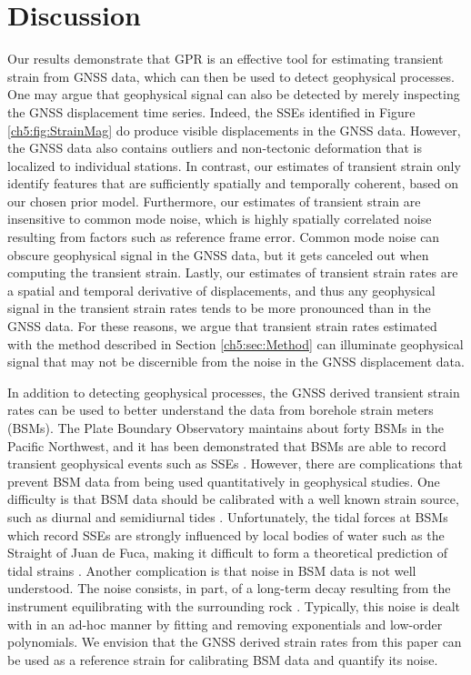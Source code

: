 \section{Discussion}\label{ch5:sec:Discussion}
Our results demonstrate that GPR is an effective tool for estimating
transient strain from GNSS data, which can then be used to detect
geophysical processes. One may argue that geophysical signal can also
be detected by merely inspecting the GNSS displacement time series.
Indeed, the SSEs identified in Figure \ref{ch5:fig:StrainMag} do
produce visible displacements in the GNSS data. However, the GNSS data
also contains outliers and non-tectonic deformation that is localized
to individual stations. In contrast, our estimates of transient strain
only identify features that are sufficiently spatially and temporally
coherent, based on our chosen prior model. Furthermore, our estimates
of transient strain are insensitive to common mode noise, which is
highly spatially correlated noise resulting from factors such as
reference frame error. Common mode noise can obscure geophysical
signal in the GNSS data, but it gets canceled out when computing the
transient strain. Lastly, our estimates of transient strain rates are
a spatial and temporal derivative of displacements, and thus any
geophysical signal in the transient strain rates tends to be more
pronounced than in the GNSS data. For these reasons, we argue that
transient strain rates estimated with the method described in Section
\ref{ch5:sec:Method} can illuminate geophysical signal that may not be
discernible from the noise in the GNSS displacement data.

In addition to detecting geophysical processes, the GNSS derived
transient strain rates can be used to better understand the data from
borehole strain meters (BSMs). The Plate Boundary Observatory
maintains about forty BSMs in the Pacific Northwest, and it has been
demonstrated that BSMs are able to record transient geophysical events
such as SSEs \citep[e.g.,][]{Dragert2011}. However, there are
complications that prevent BSM data from being used quantitatively in
geophysical studies. One difficulty is that BSM data should be
calibrated with a well known strain source, such as diurnal and
semidiurnal tides \citep{Hart1996,Roeloffs2010,Hodgkinson2013}.
Unfortunately, the tidal forces at BSMs which record SSEs are strongly
influenced by local bodies of water such as the Straight of Juan de
Fuca, making it difficult to form a theoretical prediction of tidal
strains \citep{Roeloffs2010}. Another complication is that noise in
BSM data is not well understood. The noise consists, in part, of a
long-term decay resulting from the instrument equilibrating with the
surrounding rock \citep{Gladwin1987}. Typically, this noise is dealt
with in an ad-hoc manner by fitting and removing exponentials and
low-order polynomials. We envision that the GNSS derived strain rates
from this paper can be used as a reference strain for calibrating BSM
data and quantify its noise.


